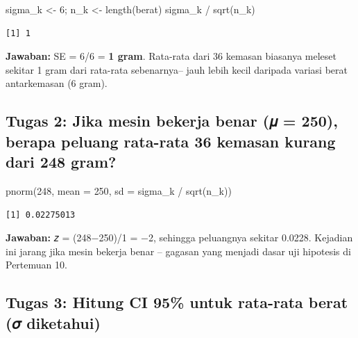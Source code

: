 \documentclass[
  indonesian,
  letterpaper,
]{book}
\newenvironment{Shaded}{\begin{snugshade}}{\end{snugshade}}
\newcommand{\AttributeTok}[1]{\textcolor[rgb]{0.40,0.45,0.13}{#1}}
\newcommand{\DecValTok}[1]{\textcolor[rgb]{0.68,0.00,0.00}{#1}}
\newcommand{\FunctionTok}[1]{\textcolor[rgb]{0.28,0.35,0.67}{#1}}
\newcommand{\NormalTok}[1]{\textcolor[rgb]{0.00,0.23,0.31}{#1}}
\newcommand{\OtherTok}[1]{\textcolor[rgb]{0.00,0.23,0.31}{#1}}
\newcommand{\SpecialCharTok}[1]{\textcolor[rgb]{0.37,0.37,0.37}{#1}}
\begin{document}
\begin{Shaded}
\begin{Highlighting}[]
\NormalTok{sigma\_k }\OtherTok{\textless{}{-}} \DecValTok{6}\NormalTok{; n\_k }\OtherTok{\textless{}{-}} \FunctionTok{length}\NormalTok{(berat)}
\NormalTok{sigma\_k }\SpecialCharTok{/} \FunctionTok{sqrt}\NormalTok{(n\_k)}
\end{Highlighting}
\end{Shaded}

\begin{verbatim}
[1] 1
\end{verbatim}

\textbf{Jawaban:} SE = 6/6 = \textbf{1 gram}. Rata-rata dari 36 kemasan
biasanya meleset sekitar 1 gram dari rata-rata sebenarnya-- jauh lebih
kecil daripada variasi berat antarkemasan (6 gram).

\subsection{Tugas 2: Jika mesin bekerja benar (𝜇 = 250), berapa peluang
rata-rata 36 kemasan kurang dari 248
gram?}\label{tugas-2-jika-mesin-bekerja-benar-ux1d707-250-berapa-peluang-rata-rata-36-kemasan-kurang-dari-248-gram}

\begin{Shaded}
\begin{Highlighting}[]
\FunctionTok{pnorm}\NormalTok{(}\DecValTok{248}\NormalTok{, }\AttributeTok{mean =} \DecValTok{250}\NormalTok{, }\AttributeTok{sd =}\NormalTok{ sigma\_k }\SpecialCharTok{/} \FunctionTok{sqrt}\NormalTok{(n\_k))}
\end{Highlighting}
\end{Shaded}

\begin{verbatim}
[1] 0.02275013
\end{verbatim}

\textbf{Jawaban:} 𝑧 = (248−250)/1 = −2, sehingga peluangnya sekitar
0.0228. Kejadian ini jarang jika mesin bekerja benar -- gagasan yang
menjadi dasar uji hipotesis di Pertemuan 10.

\subsection{Tugas 3: Hitung CI 95\% untuk rata-rata berat (𝜎
diketahui)}\label{tugas-3-hitung-ci-95-untuk-rata-rata-berat-ux1d70e-diketahui}
\end{document}
